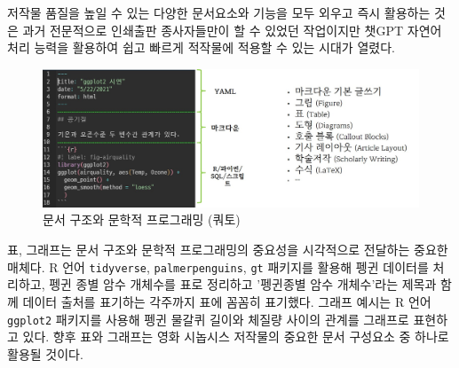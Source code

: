 \documentclass[
  letterpaper,
]{book}
\begin{document}
저작물 품질을 높일 수 있는 다양한 문서요소와 기능을 모두 외우고 즉시
활용하는 것은 과거 전문적으로 인쇄출판 종사자들만이 할 수 있었던
작업이지만 챗GPT 자연어 처리 능력을 활용하여 쉽고 빠르게 적작물에 적용할
수 있는 시대가 열렸다.

\begin{figure}

{\centering \includegraphics{images/layout_format.jpg}

}

\caption{문서 구조와 문학적 프로그래밍 (쿼토)}

\end{figure}

표, 그래프는 문서 구조와 문학적 프로그래밍의 중요성을 시각적으로
전달하는 중요한 매체다. R 언어 \texttt{tidyverse},
\texttt{palmerpenguins}, \texttt{gt} 패키지를 활용해 펭귄 데이터를
처리하고, 펭귄 종별 암수 개체수를 표로 정리하고 '펭귄종별 암수
개체수'라는 제목과 함께 데이터 출처를 표기하는 각주까지 표에 꼼꼼히
표기했다. 그래프 예시는 R 언어 \texttt{ggplot2} 패키지를 사용해 펭귄
물갈퀴 길이와 체질량 사이의 관계를 그래프로 표현하고 있다. 향후 표와
그래프는 영화 시놉시스 저작물의 중요한 문서 구성요소 중 하나로 활용될
것이다.
\end{document}
